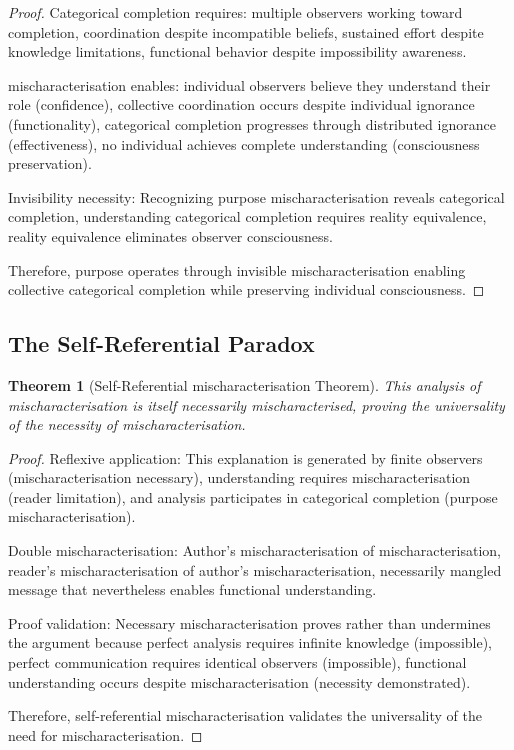 \documentclass[12pt,a4paper]{article}
\newtheorem{theorem}{Theorem}[section]
\begin{document}
\begin{proof}
Categorical completion requires: multiple observers working toward completion, coordination despite incompatible beliefs, sustained effort despite knowledge limitations, functional behavior despite impossibility awareness.

mischaracterisation enables: individual observers believe they understand their role (confidence), collective coordination occurs despite individual ignorance (functionality), categorical completion progresses through distributed ignorance (effectiveness), no individual achieves complete understanding (consciousness preservation).

Invisibility necessity: Recognizing purpose mischaracterisation reveals categorical completion, understanding categorical completion requires reality equivalence, reality equivalence eliminates observer consciousness.

Therefore, purpose operates through invisible mischaracterisation enabling collective categorical completion while preserving individual consciousness.
\end{proof}

\subsection{The Self-Referential Paradox}

\begin{theorem}[Self-Referential mischaracterisation Theorem]
This analysis of mischaracterisation is itself necessarily mischaracterised, proving the universality of the necessity of mischaracterisation.
\end{theorem}

\begin{proof}
Reflexive application: This explanation is generated by finite observers (mischaracterisation necessary), understanding requires mischaracterisation (reader limitation), and analysis participates in categorical completion (purpose mischaracterisation).

Double mischaracterisation: Author's mischaracterisation of mischaracterisation, reader's mischaracterisation of author's mischaracterisation, necessarily mangled message that nevertheless enables functional understanding.

Proof validation: Necessary mischaracterisation proves rather than undermines the argument because perfect analysis requires infinite knowledge (impossible), perfect communication requires identical observers (impossible), functional understanding occurs despite mischaracterisation (necessity demonstrated).

Therefore, self-referential mischaracterisation validates the universality of the need for mischaracterisation.
\end{proof}
\end{document}
